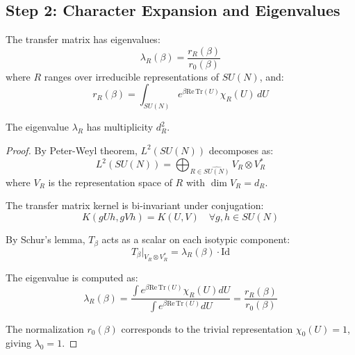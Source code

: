 \subsection{Step 2: Character Expansion and Eigenvalues}

\begin{theorem}
\label{thm:spectral-decomp}
The transfer matrix has eigenvalues:
\begin{equation}
\lambda_R(\beta) = \frac{r_R(\beta)}{r_0(\beta)}
\end{equation}
where $R$ ranges over irreducible representations of $SU(N)$, and:
\begin{equation}
r_R(\beta) = \int_{SU(N)} e^{\beta \mathrm{Re}\,\mathrm{Tr}(U)} \chi_R(U) \, dU
\end{equation}

The eigenvalue $\lambda_R$ has multiplicity $d_R^2$.
\end{theorem}

\begin{proof}
By Peter-Weyl theorem, $L^2(SU(N))$ decomposes as:
\begin{equation}
L^2(SU(N)) = \bigoplus_{R \in \widehat{SU(N)}} V_R \otimes V_R^*
\end{equation}
where $V_R$ is the representation space of $R$ with $\dim V_R = d_R$.

The transfer matrix kernel is bi-invariant under conjugation:
\begin{equation}
K(gUh, gVh) = K(U, V) \quad \forall g, h \in SU(N)
\end{equation}

By Schur's lemma, $T_\beta$ acts as a scalar on each isotypic component:
\begin{equation}
T_\beta|_{V_R \otimes V_R^*} = \lambda_R(\beta) \cdot \mathrm{Id}
\end{equation}

The eigenvalue is computed as:
\begin{equation}
\lambda_R(\beta) = \frac{\int e^{\beta \mathrm{Re}\,\mathrm{Tr}(U)} \chi_R(U) dU}{\int e^{\beta \mathrm{Re}\,\mathrm{Tr}(U)} dU} = \frac{r_R(\beta)}{r_0(\beta)}
\end{equation}

The normalization $r_0(\beta)$ corresponds to the trivial representation 
$\chi_0(U) = 1$, giving $\lambda_0 = 1$.
\end{proof}

